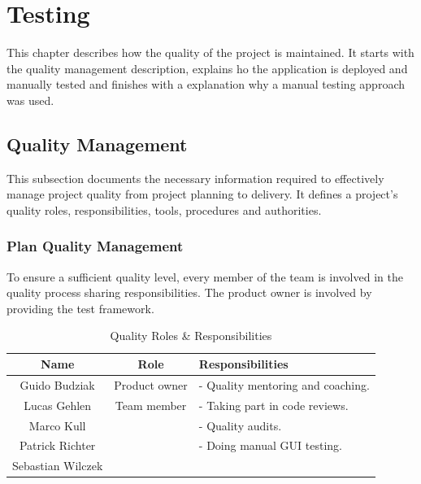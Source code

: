 \section{Testing}
\label{sec:testing}

This chapter describes how the quality of the project is maintained. It starts with the quality management description, explains ho the application is deployed and manually tested and finishes with a explanation why a manual testing approach was used. 

\subsection{Quality Management}
\label{ssec:quality_management}

This subsection documents the necessary information required to effectively manage project quality from project planning to delivery. It defines a project’s quality roles, responsibilities, tools, procedures and authorities.

\subsubsection{Plan Quality Management}
\label{ssec:plan_quality}

To ensure a sufficient quality level, every member of the team is involved in the quality process sharing responsibilities. The product owner is involved by providing the test framework.

\begin{table}[H]
    \centering
    \begin{tabular}{|c|c|l|}
        \hline
        \cellcolor{gray}Name & 
        \cellcolor{gray}Role &
        \cellcolor{gray}Responsibilities \\ \hline
        Guido Budziak & Product owner & - Quality mentoring and coaching.\\ \hline
        Lucas Gehlen&Team member&- Taking part in code reviews.\\
        Marco Kull&&- Quality audits.\\
        Patrick Richter&&- Doing manual GUI testing.\\
        Sebastian Wilczek && \\ \hline
    \end{tabular}
    \caption{Quality Roles \& Responsibilities}
    \label{tab:quality_roles}
\end{table}

